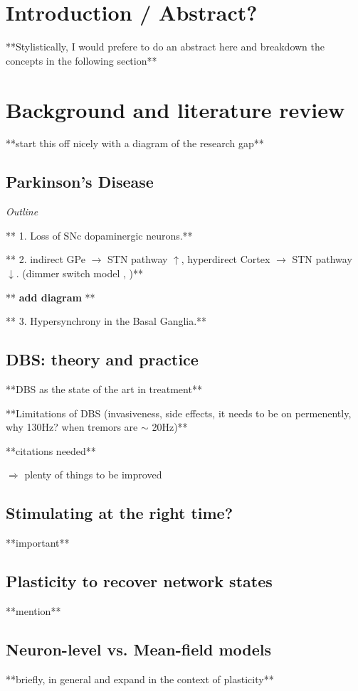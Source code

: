 \section{Introduction / Abstract?}
**Stylistically, I would prefere to do an abstract here and breakdown the concepts in the following section**
\section{Background and literature review}
**start this off nicely with a diagram of the research gap**

\subsection{Parkinson's Disease}
\textit{Outline}

** 1. Loss of SNc dopaminergic neurons.**

** 2. indirect GPe $\rightarrow$ STN pathway $\uparrow$,
hyperdirect Cortex $\rightarrow$ STN pathway $\downarrow$.
(dimmer switch model \cite{helmich2012cerebral}, \cite{west2022stimulating})**

** \textbf{add diagram} **

** 3. Hypersynchrony in the Basal Ganglia.**

\subsection{DBS: theory and practice}
**DBS as the state of the art in treatment**

**Limitations of DBS (invasiveness, side effects, it needs to be on permenently,
why 130Hz? when tremors are $\sim$ 20Hz)**

**citations needed**

$\Rightarrow$ plenty of things to be improved

\subsection{Stimulating at the right time?}
**important** \cite{cagnan2017stimulating} \cite{beudel2018adaptive} \cite{west2022stimulating}

\subsection{Plasticity to recover network states}
**mention** \cite{lebedev2017brain} \cite{cramer2011harnessing}

\subsection{Neuron-level vs. Mean-field models}
**briefly, in general and expand in the context of plasticity**

